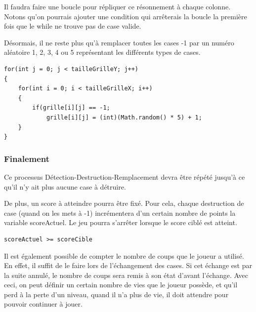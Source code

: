 	Il faudra faire une boucle pour répliquer ce résonnement à chaque colonne. Notons qu'on pourrais ajouter une condition qui arrêterais la boucle la première fois que le while ne trouve pas de case valide.
	
	Désormais, il ne reste plus qu'à remplacer toutes les cases -1 par un numéro aléatoire 1, 2, 3, 4 ou 5 représentant les différents types de cases.

\begin{lstlisting}
for(int j = 0; j < tailleGrilleY; j++)
{
	for(int i = 0; i < tailleGrilleX; i++)
	{
		if(grille[i][j] == -1;
			grille[i][j] = (int)(Math.random() * 5) + 1;
	}
}
\end{lstlisting}

\subsubsection{Finalement}

Ce processus Détection-Destruction-Remplacement devra être répété jusqu'à ce qu'il n'y ait plus aucune case à détruire.

De plus, un score à atteindre pourra être fixé. Pour cela, chaque destruction de case (quand on les mets à -1) incrémentera d'un certain nombre de points la variable scoreActuel. Le jeu pourra s'arrêter lorsque le score ciblé est atteint.
\begin{lstlisting}
scoreActuel >= scoreCible
\end{lstlisting}

Il est également possible de compter le nombre de coups que le joueur a utilisé. En effet, il suffit de le faire lors de l'échangement des cases. Si cet échange est par la suite annulé, le nombre de coups sera remis à son état d'avant l'échange.
Avec ceci, on peut définir un certain nombre de vies que le joueur possède, et qu'il perd à la perte d'un niveau, quand il n'a plus de vie, il doit attendre pour pouvoir continuer à jouer.

